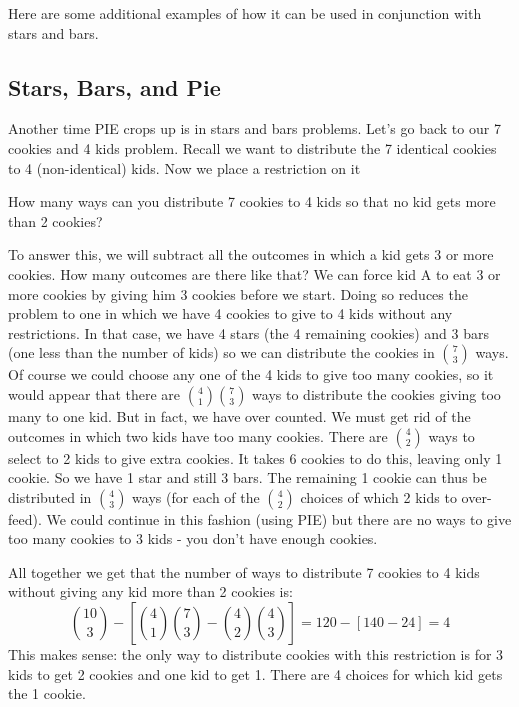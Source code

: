 \documentclass[12pt]{article}
\begin{document}
Here are some additional examples of how it can be used in conjunction with stars and bars.

\subsection{Stars, Bars, and Pie}

Another time PIE crops up is in stars and bars problems.  Let's go back to our 7 cookies and 4 kids problem.  Recall we want to distribute the 7 identical cookies to 4 (non-identical) kids.  Now we place a restriction on it

\begin{example}
How many ways can you distribute 7 cookies to 4 kids so that no kid gets more than 2 cookies?  

\begin{solution}
To answer this, we will subtract all the outcomes in which a kid gets 3 or more cookies.  How many outcomes are there like that?  We can force kid A to eat 3 or more cookies by giving him 3 cookies before we start.  Doing so reduces the problem to one in which we have 4 cookies to give to 4 kids without any restrictions.  In that case, we have 4 stars (the 4 remaining cookies) and 3 bars (one less than the number of kids) so we can distribute the cookies in ${7 \choose 3}$ ways.  Of course we could choose any one of the 4 kids to give too many cookies, so it would appear that there are ${4 \choose 1}{7 \choose 3}$ ways to distribute the cookies giving too many to one kid.  But in fact, we have over counted.  We must get rid of the outcomes in which two kids have too many cookies.  There are ${4 \choose 2}$ ways to select to 2 kids to give extra cookies.  It takes 6 cookies to do this, leaving only 1 cookie.  So we have 1 star and still 3 bars.  The remaining 1 cookie can thus be distributed in ${4 \choose 3}$ ways (for each of the ${4 \choose 2}$ choices of which 2 kids to over-feed).  We could continue in this fashion (using PIE) but there are no ways to give too many cookies to 3 kids - you don't have enough cookies.

All together we get that the number of ways to distribute 7 cookies to 4 kids without giving any kid more than 2 cookies is:
\[{10 \choose 3} - \left[{4 \choose 1}{7 \choose 3} - {4 \choose 2}{4 \choose 3}\right] = 120 - [ 140 - 24] = 4\]
This makes sense: the only way to distribute cookies with this restriction is for 3 kids to get 2 cookies and one kid to get 1.  There are 4 choices for which kid gets the 1 cookie.
\end{solution}
\end{example}
\end{document}
